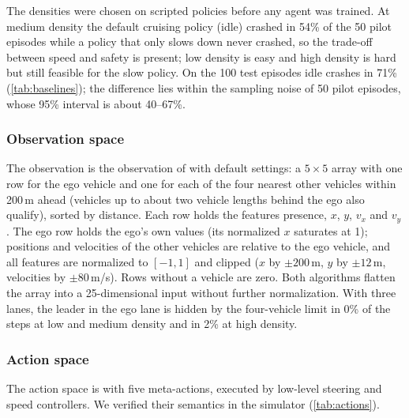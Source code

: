 The densities were chosen on scripted policies before any agent was trained. At medium density the default cruising
policy (idle) crashed in 54\% of the 50 pilot episodes while a policy that only slows down never crashed, so the
trade-off between speed and safety is present; low density is easy and high density is hard but still feasible for the
slow policy. On the 100 test episodes idle crashes in 71\% (\cref{tab:baselines}); the difference lies within
the sampling noise of 50 pilot episodes, whose 95\% interval is about 40--67\%.

\subsubsection{Observation space}
The observation is the  observation of  with default settings: a $5 \times 5$ array with
one row for the ego vehicle and one for each of the four nearest other vehicles within 200\,m ahead (vehicles up to
about two vehicle lengths behind the ego also qualify), sorted by distance. Each row holds the features presence, $x$,
$y$, $v_x$ and $v_y$. The ego row holds the ego's own values (its normalized $x$ saturates at 1); positions and
velocities of the other vehicles are relative to the ego vehicle, and all features are normalized to $[-1, 1]$ and clipped ($x$ by $\pm 200$\,m, $y$ by $\pm 12$\,m,
velocities by $\pm 80$\,m/s). Rows without a vehicle are zero. Both algorithms flatten the array into a 25-dimensional
input without further normalization. With three lanes, the leader in the ego lane is hidden by the four-vehicle limit
in 0\% of the steps at low and medium density and in 2\% at high density.

\subsubsection{Action space}
The action space is  with five meta-actions, executed by low-level steering and speed
controllers. We verified their semantics in the simulator (\cref{tab:actions}).

